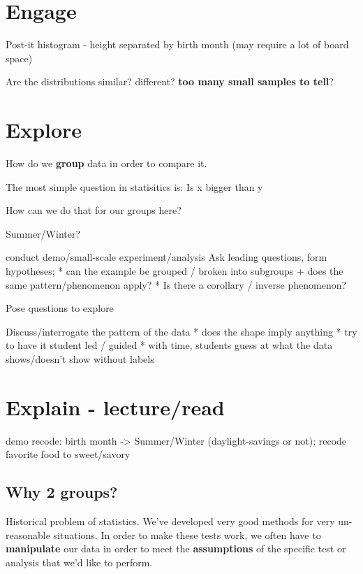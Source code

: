 \documentclass[
]{book}
\begin{document}
\hypertarget{engage-3}{%
\section{Engage}\label{engage-3}}

Post-it histogram - height separated by birth month (may require a lot of board space)

Are the distributions similar? different? \textbf{too many small samples to tell}?

\hypertarget{explore-3}{%
\section{Explore}\label{explore-3}}

How do we \textbf{group} data in order to compare it.

The most simple question in statisitics is:
Is x bigger than y

How can we do that for our groups here?

Summer/Winter?

conduct demo/small-scale experiment/analysis
Ask leading questions, form hypotheses;
* can the example be grouped / broken into subgroups
+ does the same pattern/phenomenon apply?
* Is there a corollary / inverse phenomenon?

Pose questions to explore

Discuss/interrogate the pattern of the data
* does the shape imply anything
* try to have it student led / guided
* with time, students guess at what the data shows/doesn't show without labels

\hypertarget{explain---lectureread-2}{%
\section{Explain - lecture/read}\label{explain---lectureread-2}}

demo recode: birth month -\textgreater{} Summer/Winter (daylight-savings or not);
recode favorite food to sweet/savory

\hypertarget{why-2-groups}{%
\subsection{Why 2 groups?}\label{why-2-groups}}

Historical problem of statistics. We've developed very good methods for very un-reasonable
situations. In order to make these tests work, we often have to \textbf{manipulate}
our data in order to meet the \textbf{assumptions} of the specific test or analysis
that we'd like to perform.
\end{document}
